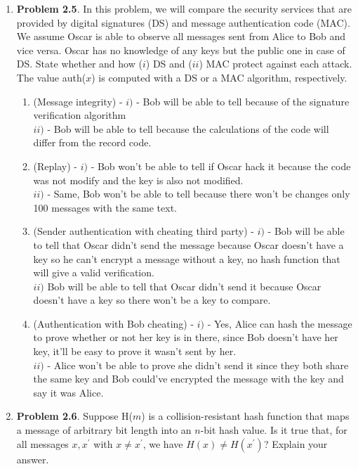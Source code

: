 \documentclass[12pt]{article}
\begin{document}
\begin{enumerate}
		\vspace{10pt}
	
	
	\item {\textbf{Problem 2.5}. In this problem, we will compare the security services that are provided by digital signatures (DS) and message authentication code (MAC). We assume Oscar is able to observe all messages sent from Alice to Bob and vice versa. Oscar has no knowledge of any keys but the public one in case of DS. State whether and how ($i$) DS and ($ii$) MAC protect against each attack. The value auth($x$) is computed with a DS or a MAC algorithm, respectively.}   
	
	\begin{enumerate}
	\item (Message integrity) - $i)$ - Bob will be able to tell because of the signature verification algorithm\\ $ii)$ - Bob will be able to tell because the calculations of the code will differ from the record code.
	\item (Replay) -  $i)$ - Bob won't be able to tell if Oscar hack it because the code was not modify and the key is also not modified. \\ $ii)$  - Same, Bob won't be able to tell because there won't be changes only 100 messages with the same text. 
	\item (Sender authentication with cheating third party) - $i)$ - Bob will be able to tell that Oscar didn't send the message because Oscar doesn't have a key so he can't encrypt a message without a key, no hash function that will give a valid verification. \\ $ii)$ Bob will be able to tell that Oscar didn't send it because Oscar doesn't have a key so there won't be a key to compare.
	\item (Authentication with Bob cheating) -  $i)$ - Yes, Alice can hash the message to prove whether or not her key is in there, since Bob doesn't have her key, it'll be easy to prove it wasn't sent by her. \\ $ii)$ - Alice won't be able to prove she didn't send it since they both share the same key and Bob could've encrypted the message with the key and say it was Alice. 
	
	\end{enumerate}
			
	\vspace{10pt}
	\item {\textbf{Problem 2.6}. Suppose H($m$) is a collision-resistant hash function that maps a message of arbitrary bit length into an $n$-bit hash value. Is it true that, for all messages $x,x^'$ with $x\neq x^'$, we have $H(x)\neq H(x^')$? Explain your answer.}
	

\end{enumerate}
\end{document}
